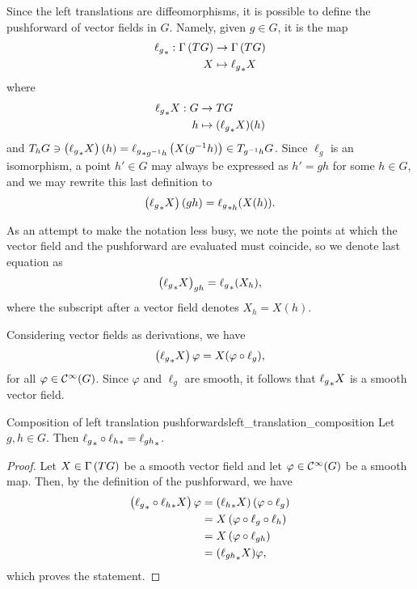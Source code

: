 Since the left translations are diffeomorphisms, it is possible to define the pushforward of vector fields in \(G\). Namely, given \(g \in G\), it is the map
\begin{align*}
    \pf{\ell_g} : \sections{TG} &\to \sections{TG}\\
                                 X &\mapsto \pf{\ell_g}X
\end{align*}
where
\begin{align*}
    \pf{\ell_g}X : G &\to TG\\
                      h &\mapsto (\pf{\ell_g}X)(h)
\end{align*}
and \(T_{h}G \ni \left(\pf{\ell_g}X\right)(h) = \pf[g^{-1}h]{\ell_g}\left(X(g^{-1}h)\right) \in T_{g^{-1}h}G\). Since \(\ell_g\) is an isomorphism, a point \(h' \in G\) may always be expressed as \(h' = gh\) for some \(h \in G\), and we may rewrite this last definition to
\begin{equation*}
    \left(\pf{\ell_g}X\right)(gh) = \pf[h]{\ell_g}(X(h)).
\end{equation*}

As an attempt to make the notation less busy, we note the points at which the vector field and the pushforward are evaluated must coincide, so we denote last equation as
\begin{equation*}
    \left(\pf{\ell_g}X\right)_{gh} = \pf{\ell_g}(X_h),
\end{equation*}
where the subscript after a vector field denotes \(X_h = X(h).\)

Considering vector fields as derivations, we have
\begin{equation*}
    \left(\pf{\ell_g}X\right)\varphi = X(\varphi\circ \ell_g),
\end{equation*}
for all \(\varphi \in \smooth{G}\). Since \(\varphi\) and \(\ell_g\) are smooth, it follows that \(\pf{\ell_g}X\) is a smooth vector field.

\begin{lemma}{Composition of left translation pushforwards}{left_translation_composition}
    Let \(g, h \in G.\) Then \(\pf{\ell_g} \circ \pf{\ell_h} = \pf{\ell_{gh}}\).
\end{lemma}
\begin{proof}
    Let \(X \in \sections{TG}\) be a smooth vector field and let \(\varphi \in \smooth{G}\) be a smooth map. Then, by the definition of the pushforward, we have
    \begin{align*}
        \left(\pf{\ell_g} \circ \pf{\ell_h} X\right)\varphi &= (\pf{\ell_h}X) \left(\varphi \circ \ell_g\right)\\
                                                                  &= X\left(\varphi \circ \ell_g \circ \ell_h\right)\\
                                                                  &= X\left(\varphi \circ \ell_{gh}\right)\\
                                                                  &= (\pf{\ell_{gh}}X)\varphi,
    \end{align*}
    which proves the statement.
\end{proof}

